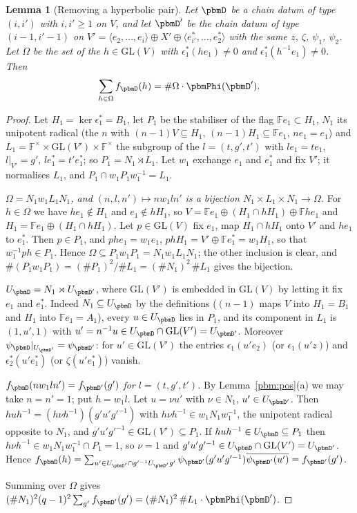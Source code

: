 \documentclass[10pt]{amsart}
\newtheorem{lemma}[theorem]{Lemma}
\theoremstyle{definition}
\theoremstyle{remark}
\providecommand{\auF}{\mathbb F}
\providecommand{\auGL}{\mathrm{GL}}
\providecommand{\aubar}[1]{\overline{#1}}
\begin{document}
\begin{lemma}[Removing a hyperbolic pair]\label{pbm:pair}
Let $\pbmD$ be a chain datum of type $(i,i')$ with $i,i'\ge1$ on $V$, and let $\pbmD'$ be the chain
datum of type $(i-1,i'-1)$ on $V'=\langle e_2,\dots,e_i\rangle\oplus X'\oplus\langle e^*_{i'},\dots,
e^*_2\rangle$ with the same $z$, $\zeta$, $\psi_1$, $\psi_2$. Let $\Omega$ be the set of the
$h\in\auGL(V)$ with $\epsilon_1^*(he_1)\ne0$ and $\epsilon_1^*(h^{-1}e_1)\ne0$. Then
\[
\sum_{h\in\Omega}f_\pbmD(h)=\#\Omega\cdot\pbmPhi(\pbmD').
\]
\end{lemma}
\begin{proof}
Let $H_1=\ker\epsilon_1^*=B_1$, let $P_1$ be the stabiliser of the flag $\auF e_1\subset H_1$,
$N_1$ its unipotent radical (the $n$ with $(n-1)V\subseteq H_1$, $(n-1)H_1\subseteq\auF e_1$,
$ne_1=e_1$) and $L_1=\auF^\times\times\auGL(V')\times\auF^\times$ the subgroup of the $l=(t,g',t')$
with $le_1=te_1$, $l|_{V'}=g'$, $le_1^*=t'e_1^*$; so $P_1=N_1\rtimes L_1$. Let $w_1$ exchange $e_1$
and $e_1^*$ and fix $V'$; it normalises $L_1$, and $P_1\cap w_1P_1w_1^{-1}=L_1$.

\emph{$\Omega=N_1w_1L_1N_1$, and $(n,l,n')\mapsto nw_1ln'$ is a bijection $N_1\times L_1\times N_1\to
\Omega$.} For $h\in\Omega$ we have $he_1\notin H_1$ and $e_1\notin hH_1$, so $V=\auF e_1\oplus(H_1
\cap hH_1)\oplus\auF he_1$ and $H_1=\auF e_1\oplus(H_1\cap hH_1)$. Let $p\in\auGL(V)$ fix $e_1$, map
$H_1\cap hH_1$ onto $V'$ and $he_1$ to $e_1^*$. Then $p\in P_1$, and $phe_1=w_1e_1$, $phH_1=V'\oplus
\auF e_1^*=w_1H_1$, so that $w_1^{-1}ph\in P_1$. Hence $\Omega\subseteq P_1w_1P_1=N_1w_1L_1N_1$; the
other inclusion is clear, and $\#(P_1w_1P_1)=(\#P_1)^2/\#L_1=(\#N_1)^2\,\#L_1$ gives the bijection.

\emph{$U_\pbmD=N_1\rtimes U_{\pbmD'}$}, where $\auGL(V')$ is embedded in $\auGL(V)$ by letting it
fix $e_1$ and $e_1^*$. Indeed $N_1\subseteq U_\pbmD$ by the definitions ($(n-1)$ maps $V$ into
$H_1=B_1$ and $H_1$ into $\auF e_1=A_1$), every $u\in U_\pbmD$ lies in $P_1$, and its component in
$L_1$ is $(1,u',1)$ with $u'=n^{-1}u\in U_\pbmD\cap\auGL(V')=U_{\pbmD'}$. Moreover
$\psi_\pbmD|_{U_{\pbmD'}}=\psi_{\pbmD'}$: for $u'\in\auGL(V')$ the entries $\epsilon_1(u'e_2)$ (or
$\epsilon_1(u'z)$) and $\epsilon_2^*(u'e_1^*)$ (or $\zeta(u'e_1^*)$) vanish.

\emph{$f_\pbmD(nw_1ln')=f_{\pbmD'}(g')$ for $l=(t,g',t')$.} By Lemma~\ref{pbm:pos}(a) we may take
$n=n'=1$; put $h=w_1l$. Let $u=\nu u'$ with $\nu\in N_1$, $u'\in U_{\pbmD'}$. Then $huh^{-1}=(h\nu
h^{-1})(g'u'g'^{-1})$ with $h\nu h^{-1}\in w_1N_1w_1^{-1}$, the unipotent radical opposite to $N_1$,
and $g'u'g'^{-1}\in\auGL(V')\subseteq P_1$. If $huh^{-1}\in U_\pbmD\subseteq P_1$ then $h\nu h^{-1}\in
w_1N_1w_1^{-1}\cap P_1=1$, so $\nu=1$ and $g'u'g'^{-1}\in U_\pbmD\cap\auGL(V')=U_{\pbmD'}$. Hence
$f_\pbmD(h)=\sum_{u'\in U_{\pbmD'}\cap g'^{-1}U_{\pbmD'}g'}\psi_{\pbmD'}(g'u'g'^{-1})\aubar{\psi_{\pbmD'}(u')}=
f_{\pbmD'}(g')$.

Summing over $\Omega$ gives $(\#N_1)^2(q-1)^2\sum_{g'}f_{\pbmD'}(g')=(\#N_1)^2\,\#L_1\cdot\pbmPhi(\pbmD')$.
\end{proof}
\end{document}
